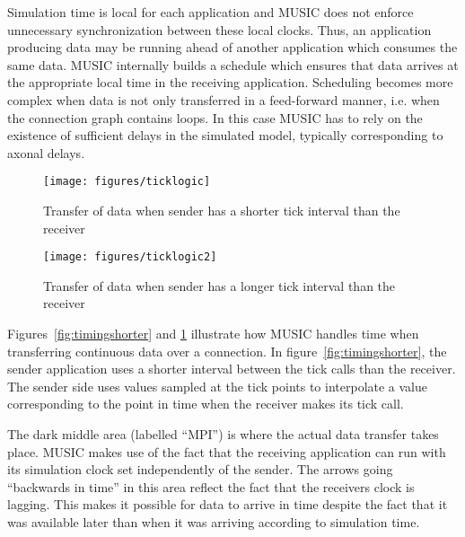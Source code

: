 \documentclass[a4paper]{report}
\begin{document}
Simulation time is local for each application
and MUSIC does not enforce unnecessary synchronization between these
local clocks.  Thus, an application producing data may be running
ahead of another application which consumes the same data.  MUSIC
internally builds a schedule which ensures that data arrives at the
appropriate local time in the receiving application.  Scheduling
becomes more complex when data is not only transferred in a
feed-forward manner, i.e. when the connection graph contains loops.
In this case MUSIC has to rely on the existence of sufficient delays
in the simulated model, typically corresponding to axonal
delays.

\begin{figure}
  \begin{center}
    \begin{minipage}{0.45\textwidth}
      \texttt{[image: figures/ticklogic]}
      \caption[Timing of data transfer, slowdown]{\label{fig:timingshorter}
        Transfer of data when sender has a shorter
        tick interval than the receiver}
    \end{minipage}
    \hfill
    \begin{minipage}{0.45\textwidth}
      \texttt{[image: figures/ticklogic2]}
      \caption[Timing of data transfer, speedup]{\label{fig:timinglonger}
        Transfer of data when sender has a longer
        tick interval than the receiver}
    \end{minipage}
  \end{center}
\end{figure}

Figures~\ref{fig:timingshorter} and \ref{fig:timinglonger} illustrate
how MUSIC handles time when transferring continuous data over a connection.
In figure~\ref{fig:timingshorter}, the sender application uses a
shorter interval between the tick calls than the receiver.  The sender
side uses values sampled at the tick points to interpolate a value
corresponding to the point in time when the receiver makes its tick
call.

The dark middle area (labelled ``MPI'') is where the actual data
transfer takes place.  MUSIC makes use of the fact that the receiving
application can run with its simulation clock set independently of the
sender.  The arrows going ``backwards in time'' in this area reflect
the fact that the receivers clock is lagging.  This makes it possible
for data to arrive in time despite the fact that it was available
later than when it was arriving according to simulation time.
\end{document}
